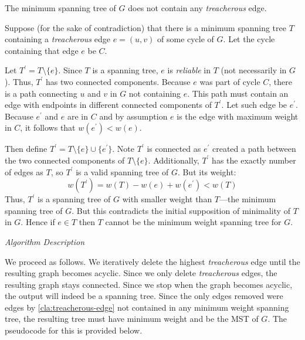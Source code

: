 \documentclass[10pt, letterpaper]{article}
\begin{document}
\begin{enumerate}[label={\bfseries Q\arabic*.}]
    \begin{claim}
      \label{cla:treacherous-edge}
      The minimum spanning tree of $G$ does not contain any \textit{treacherous} edge.
    \end{claim}

    \begin{proof*}
      Suppose (for the sake of contradiction) that there is a minimum spanning tree $T$ containing
      a \textit{treacherous} edge $e = (u, v)$ of some cycle of $G$. Let the cycle containing that
      edge $e$ be $C$. \par
      Let $T^\prime = T \setminus \{e\}$. Since $T$ is a spanning tree, $e$ is \textit{reliable}
      in $T$ (not necessarily in $G$). Thus, $T^\prime$ has two connected components. Because $e$
      was part of cycle $C$, there is a path connecting $u$ and $v$ in $G$ not containing $e$.
      This path must contain an edge with endpoints in different connected components of $T^\prime$.
      Let such edge be $e^\prime$. Because $e^\prime$ and $e$ are in $C$ and by assumption $e$ is
      the edge with maximum weight in $C$, it follows that $w(e^\prime) < w(e)$. \par
      Then define $T^\prime = T \setminus \{e\} \cup \{e^\prime\}$. Note $T^\prime$ is connected as
      $e^\prime$ created a path between the two connected components of $T \setminus \{e\}$.
      Additionally, $T^\prime$ has the exactly number of edges as $T$, so $T^\prime$ is a valid
      spanning tree of $G$. But its weight:
      \[
        w(T^\prime) = w(T) - w(e) + w(e^\prime) < w(T)
      \]
      Thus, $T^\prime$ is a spanning tree of $G$ with smaller weight than $T$---the minimum spanning
      tree of $G$. But this contradicts the initial supposition of minimality of $T$ in $G$. Hence if
      $e \in T$ then $T$ cannot be the minimum weight spanning tree for $G$.
    \end{proof*}

    \vspace*{\baselineskip}
    {\itshape Algorithm Description} \par
    We proceed as follows. We iteratively delete the highest \textit{treacherous} edge until the
    resulting graph becomes acyclic. Since we only delete \textit{treacherous} edges, the resulting
    graph stays connected. Since we stop when the graph becomes acyclic, the output will indeed
    be a spanning tree. Since the only edges removed were edges by \autoref{cla:treacherous-edge}
    not contained in any minimum weight spanning tree, the resulting tree must have minimum weight
    and be the MST of $G$. The pseudocode for this is provided below.


\end{enumerate}
\end{document}
